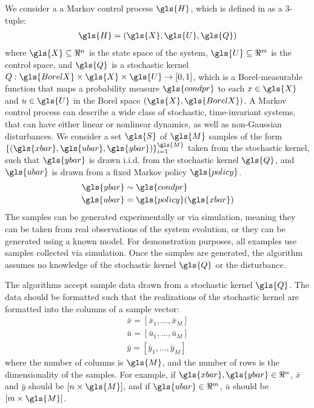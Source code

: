 \documentclass[11pt]{article}
\begin{document}
We consider a a Markov control process $\gls{H}$, which is defined in \cite{summers2010verification} as a 3-tuple:
\begin{align}
  \gls{H} = (\gls{X}, \gls{U}, \gls{Q})
\end{align}
where $\gls{X} \subseteq \Re^{n}$ is the state space of the system, $\gls{U} \subseteq \Re^{m}$ is the control space, and $\gls{Q}$ is a stochastic kernel
$Q : \gls{BorelX} \times \gls{X} \times \gls{U} \rightarrow [0, 1]$, which is a Borel-measurable function that maps a probability measure $\gls{condpr}$ to each $x \in \gls{X}$ and $u \in \gls{U}$ in the Borel space $(\gls{X}, \gls{BorelX})$.
A Markov control process can describe a wide class of stochastic, time-invariant systems, that can have either linear or nonlinear dynamics, as well as non-Gaussian disturbances.
%
We consider a set $\gls{S}$ of $\gls{M}$ samples of the form
$\lbrace (\gls{xbar}, \gls{ubar}, \gls{ybar}) \rbrace_{i=1}^{\gls{M}}$ taken from the stochastic kernel,
such that $\gls{ybar}$ is drawn i.i.d. from the stochastic kernel $\gls{Q}$,
and $\gls{ubar}$ is drawn from a fixed Markov policy $\gls{policy}$.
\begin{align}
	\gls{ybar} &\sim \gls{condpr} \\
	\gls{ubar} &= \gls{policy}(\gls{xbar})
\end{align}
The samples can be generated experimentally or via simulation, meaning they can be taken from real observations of the system evolution, or they can be generated using a known model. For demonstration purposes, all examples use samples collected via simulation.
%
Once the samples are generated, the algorithm assumes no knowledge of the stochastic kernel $\gls{Q}$ or the disturbance.

The algorithms accept sample data drawn from a stochastic kernel $\gls{Q}$. The data should be formatted such that the realizations of the stochastic kernel are formatted into the columns of a sample vector:
\begin{align}
  \bar{x} = [\bar{x}_{1}, \ldots, \bar{x}_{M}] \\
  \bar{u} = [\bar{u}_{1}, \ldots, \bar{u}_{M}] \\
  \bar{y} = [\bar{y}_{1}, \ldots, \bar{y}_{M}]
\end{align}
where the number of columns is $\gls{M}$, and the number of rows is the dimensionality of the samples. For example, if $\gls{xbar}, \gls{ybar} \in \Re^{n}$, $\bar{x}$ and $\bar{y}$ should be $[n \times \gls{M}]$, and if $\gls{ubar} \in \Re^{m}$, $\bar{u}$ should be $[m \times \gls{M}]$.
\end{document}
